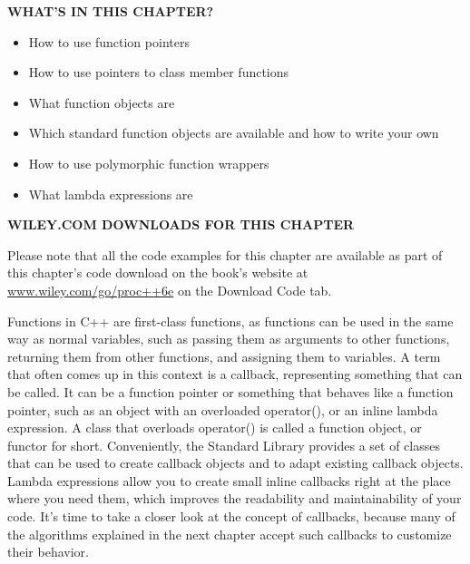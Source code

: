 \noindent
\textbf{WHAT’S IN THIS CHAPTER?}

\begin{itemize}
\item
How to use function pointers

\item
How to use pointers to class member functions

\item
What function objects are

\item
Which standard function objects are available and how to write your own

\item
How to use polymorphic function wrappers

\item
What lambda expressions are
\end{itemize}

\noindent
\textbf{WILEY.COM DOWNLOADS FOR THIS CHAPTER}

Please note that all the code examples for this chapter are available as part of this chapter’s code download on the book’s website at \url{www.wiley.com/go/proc++6e} on the Download Code tab.

Functions in C++ are first-class functions, as functions can be used in the same way as normal variables, such as passing them as arguments to other functions, returning them from other functions, and assigning them to variables. A term that often comes up in this context is a callback, representing something that can be called. It can be a function pointer or something that behaves like a function pointer, such as an object with an overloaded operator(), or an inline lambda expression. A class that overloads operator() is called a function object, or functor for short. Conveniently, the Standard Library provides a set of classes that can be used to create callback objects and to adapt existing callback objects. Lambda expressions allow you to create small inline callbacks right at the place where you need them, which improves the readability and maintainability of your code. It’s time to take a closer look at the concept of callbacks, because many of the algorithms explained in the next chapter accept such callbacks to customize their behavior.
